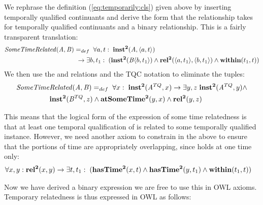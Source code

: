 We rephrase the definition (\ref{eq:temporarily:cls}) given above by inserting
temporally qualified continuants and derive the form that the relationship takes
for temporally qualified continuants and a binary relationship. This is a fairly
transparent translation:
\begin{equation}
\begin{split}
\mathit{SomeTimeRelated}(\mathit{A},\mathit{B})& =_{def}\;
\forall a, t:\; \mathrm{\mathbf{inst^2}}(\mathit{A}, \langle a,t\rangle) \\
&\ \rightarrow
\exists b, t_1:\;(\mathrm{\mathbf{inst^2}}(\mathit{B}\langle b,t_1\rangle) \wedge
\mathrm{\mathbf{rel^2}}(\langle a,t_1\rangle,\langle b,t_1\rangle) \wedge \mathrm{\mathbf{within}}(t_1,t))
\end{split}
\end{equation}
We then use the  and  relations and the TQC notation to eliminate
the tuples:
\begin{equation}
\begin{split}
\mathit{SomeTime}&\mathit{Related}(\mathit{A},\mathit{B}) =_{def}\;
\forall x:\; \mathrm{\mathbf{inst^2}}(\mathit{A}^{TQ}, x)
 \rightarrow
\exists y,z \; \mathrm{\mathbf{inst^2}}(\mathit{A}^{TQ},y) \wedge \\ & \mathrm{\mathbf{inst^2}}(\mathit{B}^{TQ},z)
 \wedge \mathrm{\mathbf{atSomeTime^2}}(y,x) \wedge \mathrm{\mathbf{rel^2}}(y,z)
\end{split}
\label{eq:usesSame}
\end{equation}

This means that the logical form of the expression of some time relatedness is that
at least one temporal qualification of  is related to some temporally
qualified  instance.
However, we need another axiom to constrain  in the above to ensure that the
portions of time are appropriately overlapping, since  holds at one time
only:
\begin{equation}
\begin{split}
\forall x,y:\;& \mathrm{\mathbf{rel^2}}(x,y) \rightarrow \exists t,t_1:\;
(\mathrm{\mathbf{hasTime^2}}(x, t) \wedge \mathrm{\mathbf{hasTime^2}}(y,t_1) \wedge \mathrm{\mathbf{within}}(t_1,t))
\end{split}
\end{equation}

Now we have derived a binary expression  we are free to use this in OWL
axioms. Temporary relatedness is thus expressed in OWL as follows:

